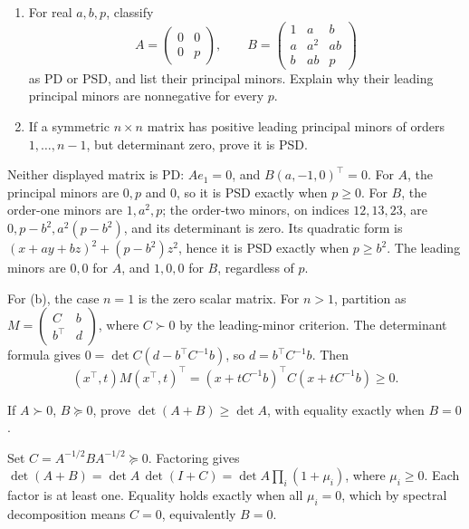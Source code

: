 \begin{problem}\label{ex:09:small-minors}
\begin{enumerate}
\item For real \(a,b,p\), classify
\[
 A=\begin{pmatrix}0&0\\0&p\end{pmatrix},\qquad
 B=\begin{pmatrix}1&a&b\\a&a^2&ab\\b&ab&p\end{pmatrix}
\]
as PD or PSD, and list their principal minors. Explain why their
leading principal minors are nonnegative for every \(p\).
\item If a symmetric \(n\times n\) matrix has positive leading principal
minors of orders \(1,\ldots,n-1\), but determinant zero, prove it is PSD.
\end{enumerate}
\end{problem}
\begin{solution}
Neither displayed matrix is PD: \(Ae_1=0\), and
\(B(a,-1,0)^\top=0\).
For \(A\), the principal minors are \(0,p\) and \(0\), so it is PSD
exactly when \(p\geqslant0\).
For \(B\), the order-one minors are \(1,a^2,p\); the order-two minors,
on indices \(12,13,23\), are
\(0,p-b^2,a^2(p-b^2)\), and its determinant is zero.
Its quadratic form is
\((x+ay+bz)^2+(p-b^2)z^2\), hence it is PSD exactly when \(p\geqslant b^2\).
The leading minors are \(0,0\) for \(A\), and \(1,0,0\) for \(B\),
regardless of \(p\).

For (b), the case \(n=1\) is the zero scalar matrix.
For \(n>1\), partition as
\(M=\begin{pmatrix}C&b\\b^\top&d\end{pmatrix}\), where \(C\succ0\)
by the leading-minor criterion. The determinant formula gives
\(0=\det C(d-b^\top C^{-1}b)\), so \(d=b^\top C^{-1}b\).
Then
\[
 (x^\top,t)M(x^\top,t)^\top
 =(x+tC^{-1}b)^\top C(x+tC^{-1}b)\geqslant0.
\]
\end{solution}

\begin{problem}\label{ex:09:det-monotone}
If \(A\succ0\), \(B\succeq0\), prove
\(\det(A+B)\geqslant\det A\), with equality exactly when \(B=0\).
\end{problem}
\begin{solution}
Set \(C=A^{-1/2}BA^{-1/2}\succeq0\).
Factoring gives
\(\det(A+B)=\det A\,\det(I+C)
=\det A\prod_i(1+\mu_i)\), where \(\mu_i\geqslant0\).
Each factor is at least one. Equality holds exactly when all \(\mu_i=0\),
which by spectral decomposition means \(C=0\), equivalently \(B=0\).
\end{solution}

